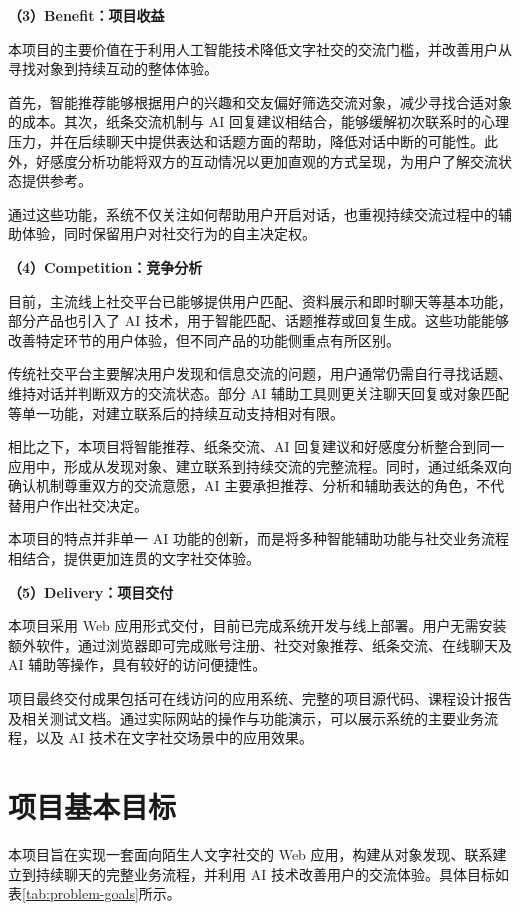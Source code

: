\noindent\textbf{（3）Benefit：项目收益}

本项目的主要价值在于利用人工智能技术降低文字社交的交流门槛，并改善用户从寻找对象到持续互动的整体体验。

首先，智能推荐能够根据用户的兴趣和交友偏好筛选交流对象，减少寻找合适对象的成本。其次，纸条交流机制与 AI 回复建议相结合，能够缓解初次联系时的心理压力，并在后续聊天中提供表达和话题方面的帮助，降低对话中断的可能性。此外，好感度分析功能将双方的互动情况以更加直观的方式呈现，为用户了解交流状态提供参考。

通过这些功能，系统不仅关注如何帮助用户开启对话，也重视持续交流过程中的辅助体验，同时保留用户对社交行为的自主决定权。

\noindent\textbf{（4）Competition：竞争分析}

目前，主流线上社交平台已能够提供用户匹配、资料展示和即时聊天等基本功能，部分产品也引入了 AI 技术，用于智能匹配、话题推荐或回复生成。这些功能能够改善特定环节的用户体验，但不同产品的功能侧重点有所区别。

传统社交平台主要解决用户发现和信息交流的问题，用户通常仍需自行寻找话题、维持对话并判断双方的交流状态。部分 AI 辅助工具则更关注聊天回复或对象匹配等单一功能，对建立联系后的持续互动支持相对有限。

相比之下，本项目将智能推荐、纸条交流、AI 回复建议和好感度分析整合到同一应用中，形成从发现对象、建立联系到持续交流的完整流程。同时，通过纸条双向确认机制尊重双方的交流意愿，AI 主要承担推荐、分析和辅助表达的角色，不代替用户作出社交决定。

本项目的特点并非单一 AI 功能的创新，而是将多种智能辅助功能与社交业务流程相结合，提供更加连贯的文字社交体验。

\noindent\textbf{（5）Delivery：项目交付}

本项目采用 Web 应用形式交付，目前已完成系统开发与线上部署。用户无需安装额外软件，通过浏览器即可完成账号注册、社交对象推荐、纸条交流、在线聊天及 AI 辅助等操作，具有较好的访问便捷性。

项目最终交付成果包括可在线访问的应用系统、完整的项目源代码、课程设计报告及相关测试文档。通过实际网站的操作与功能演示，可以展示系统的主要业务流程，以及 AI 技术在文字社交场景中的应用效果。



\section{项目基本目标}

本项目旨在实现一套面向陌生人文字社交的 Web 应用，构建从对象发现、联系建立到持续聊天的完整业务流程，并利用 AI 技术改善用户的交流体验。具体目标如表\ref{tab:problem-goals}所示。

